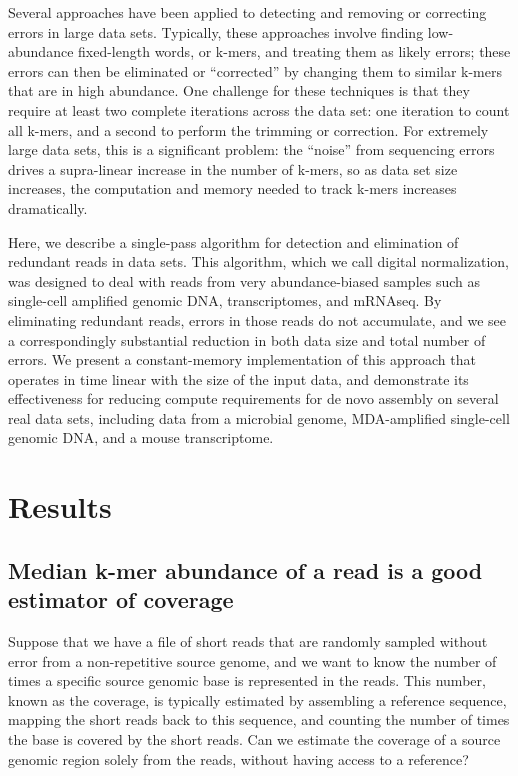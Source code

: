 \documentclass[10pt]{article}
\begin{document}
Several approaches have been applied to detecting and removing or
correcting errors in large data sets.  Typically, these approaches
involve finding low-abundance fixed-length words, or k-mers, and treating
them as likely errors; these errors can then be eliminated or
``corrected'' by changing them to similar k-mers that are in high
abundance.  One challenge for these techniques is that they
require at least two complete iterations across the data set: one
iteration to count all k-mers, and a second to perform the
trimming or correction.  For extremely large data sets, this
is a significant problem: the ``noise'' from
sequencing errors drives a supra-linear increase in the number of
k-mers, so as data set size increases, the computation and memory
needed to track k-mers increases dramatically.

Here, we describe a single-pass algorithm for detection and
elimination of redundant reads in data sets.  This algorithm, which we
call digital normalization, was designed to deal with reads
from very abundance-biased samples such as single-cell amplified
genomic DNA, transcriptomes, and mRNAseq.  By eliminating redundant
reads, errors in those reads do not accumulate, and we see a
correspondingly substantial reduction in both data size and total
number of errors.  We present a constant-memory implementation of this
approach that operates in time linear with the size of the input data, and demonstrate its
effectiveness for reducing compute requirements for de novo assembly
on several real data sets, including data from a microbial genome, MDA-amplified
single-cell genomic DNA, and a mouse transcriptome.

\section*{Results}

\subsection*{Median k-mer abundance of a read is a good estimator of coverage}

Suppose that we have a file of short reads that are randomly sampled
without error from a non-repetitive source genome, and we want to know
the number of times a specific source genomic base is represented in
the reads.  This number, known as the coverage, is typically estimated
by assembling a reference sequence, mapping the short reads back to
this sequence, and counting the number of times the base is covered by
the short reads.  Can we estimate the coverage of a source genomic
region solely from the reads, without having access to a reference?
\end{document}
